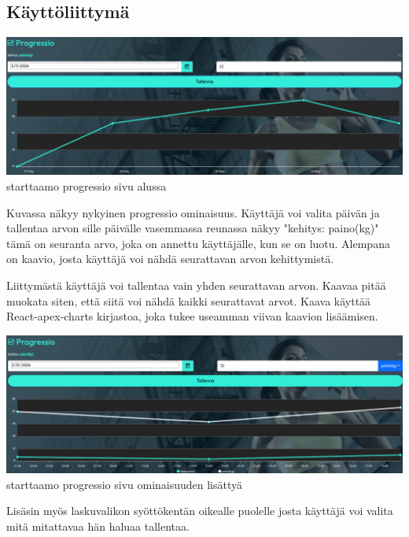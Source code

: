 \subsection*{Käyttöliittymä}



\includegraphics[width= 15cm]{src/public/progressiosingle.png} \\
starttaamo progressio sivu alussa
\medskip

Kuvassa näkyy nykyinen progressio ominaisuus. Käyttäjä voi valita päivän ja tallentaa arvon sille päivälle
vasemmassa reunassa näkyy "kehitys: paino(kg)"{} tämä on seuranta arvo, joka on annettu käyttäjälle, kun se on luotu.
Alempana on kaavio, josta käyttäjä voi nähdä seurattavan arvon kehittymistä. 
\medskip


Liittymästä käyttäjä voi tallentaa vain yhden seurattavan arvon. 
Kaavaa pitää muokata siten, että siitä voi nähdä kaikki seurattavat arvot.
Kaava käyttää React-apex-charts kirjastoa, joka tukee useamman viivan kaavion lisäämisen.
\medskip



\includegraphics[width= 15cm]{src/public/progressmulti.png} \\
starttaamo progressio sivu ominaisuuden lisättyä
\medskip


Lisäsin myös laskuvalikon syöttökentän oikealle puolelle josta käyttäjä voi valita mitä mitattavaa hän haluaa tallentaa.

